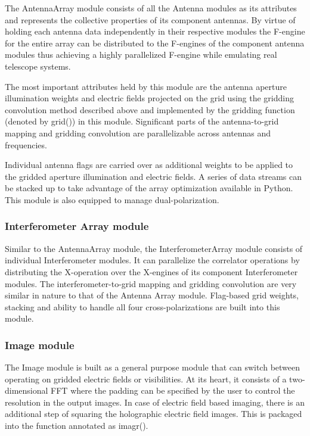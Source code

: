 \documentclass[a4paper,fleqn,usenatbib]{../mnras}
\begin{document}
The AntennaArray module consists of all the Antenna modules as its attributes
and represents the collective properties of its component antennas. By virtue of 
holding each antenna data independently in their respective modules the F-engine 
for the entire array can be distributed to the F-engines of the component 
antenna modules thus achieving a highly parallelized F-engine while emulating 
real telescope systems.

The most important attributes held by this module are the antenna aperture 
illumination weights and electric fields projected on the grid using the 
gridding convolution method described above and implemented by the gridding 
function (denoted by grid()) in this module. Significant parts of the 
antenna-to-grid mapping and gridding convolution are parallelizable 
across antennas and frequencies.

Individual antenna flags are carried over as additional weights to be applied
to the gridded aperture illumination and electric fields. A series of data 
streams can be stacked up to take advantage of the array optimization available 
in Python. This module is also equipped to manage dual-polarization. 

\subsubsection{Interferometer Array module}

Similar to the AntennaArray module, the InterferometerArray module consists of
individual Interferometer modules. It can parallelize the correlator operations
by distributing the X-operation over the X-engines of its component 
Interferometer modules. The interferometer-to-grid mapping and gridding 
convolution are very similar in nature to that of the Antenna Array module. 
Flag-based grid weights, stacking and ability to handle all four 
cross-polarizations are built into this module. 

\subsubsection{Image module}

The Image module is built as a general purpose module that can switch between 
operating on gridded electric fields or visibilities. At its heart, it consists
of a two-dimensional FFT where the padding can be specified by the user to 
control the resolution in the output images. In case of electric field based
imaging, there is an additional step of squaring the holographic electric field
images. This is packaged into the function annotated as imagr().
\end{document}
